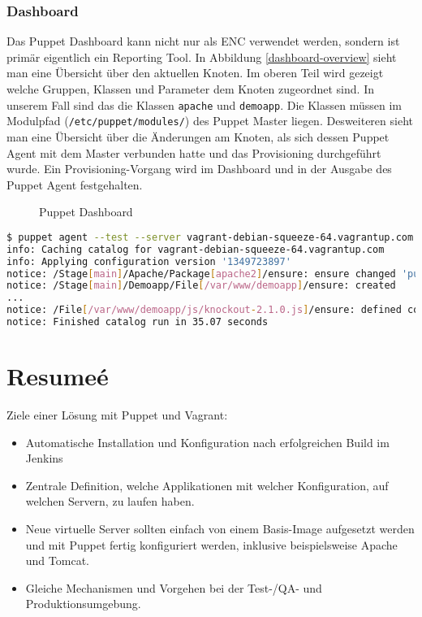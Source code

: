 \documentclass[12pt,a4paper,ngerman]{article}
\begin{document}
\subsubsection{Dashboard}

Das Puppet Dashboard kann nicht nur als ENC verwendet werden, sondern ist primär eigentlich ein Reporting Tool. In Abbildung \ref{dashboard-overview} sieht man eine Übersicht über den aktuellen Knoten. Im oberen Teil wird gezeigt welche Gruppen, Klassen und Parameter dem Knoten zugeordnet sind. In unserem Fall sind das die Klassen \lstinline$apache$ und \lstinline$demoapp$. Die Klassen müssen im Modulpfad (\lstinline$/etc/puppet/modules/$) des Puppet Master liegen. Desweiteren sieht man eine Übersicht über die Änderungen am Knoten, als sich dessen Puppet Agent mit dem Master verbunden hatte und das Provisioning durchgeführt wurde. Ein Provisioning-Vorgang wird im Dashboard und in der Ausgabe des Puppet Agent festgehalten.
\begin{figure}[ht]
\centering
{}
\caption{Puppet Dashboard}
\label{dashboard}
\end{figure}

\begin{lstlisting}[language=sh,caption=Puppet Agent Run durchführen , label=puppet-agent-run]
$ puppet agent --test --server vagrant-debian-squeeze-64.vagrantup.com
info: Caching catalog for vagrant-debian-squeeze-64.vagrantup.com
info: Applying configuration version '1349723897'
notice: /Stage[main]/Apache/Package[apache2]/ensure: ensure changed 'purged' to 'present'
notice: /Stage[main]/Demoapp/File[/var/www/demoapp]/ensure: created
...
notice: /File[/var/www/demoapp/js/knockout-2.1.0.js]/ensure: defined content as '{md5}235475c7c3dc43c7cb7f6125be536c32'
notice: Finished catalog run in 35.07 seconds
\end{lstlisting}

\section{Resumeé}

Ziele einer Lösung mit Puppet und Vagrant:
\begin{itemize}
\item Automatische Installation und Konfiguration nach erfolgreichen Build im Jenkins 
\item Zentrale Definition, welche Applikationen mit welcher Konfiguration, auf welchen Servern, zu laufen haben.
\item Neue virtuelle Server sollten einfach von einem Basis-Image aufgesetzt werden und mit Puppet fertig konfiguriert werden, inklusive beispielsweise Apache und Tomcat.
\item Gleiche Mechanismen und Vorgehen bei der Test-/QA- und Produktionsumgebung.
\end{itemize}
\end{document}
